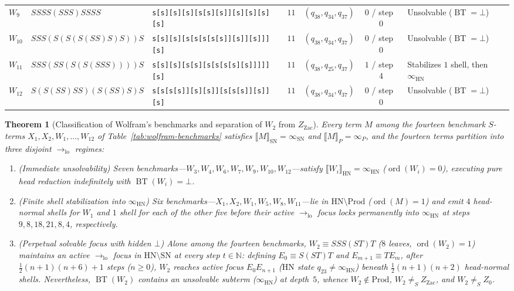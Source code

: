 \documentclass[11pt,reqno]{amsart}
\numberwithin{equation}{section}
\theoremstyle{plain}
\newtheorem{theorem}{Theorem}[section]
\theoremstyle{definition}
\theoremstyle{remark}
\DeclareMathOperator{\BT}{BT}
\DeclareMathOperator{\ord}{ord}
\newcommand{\SN}{\mathrm{SN}}
\newcommand{\HN}{\mathrm{HN}}
\newcommand{\Prod}{\mathrm{Prod}}
\newcommand{\sem}[1]{\llbracket #1 \rrbracket}
\begin{document}
\begin{table}[htbp]
\begin{tabular}{@{}lllcccl@{}}
$W_9$ & $S S S S (S S S) S S S S$ & \texttt{s[s][s][s][s[s][s]][s][s][s][s]} & $11$ & $(q_{38}, q_{34}, q_{37})$ & $0$ / step~$0$ & Unsolvable ($\BT = \bot$) \\
$W_{10}$ & $S S S (S(S(S(S S)S)S))S$ & \texttt{s[s][s][s[s[s[s[s]][s]][s]]][s]} & $11$ & $(q_{38}, q_{34}, q_{37})$ & $0$ / step~$0$ & Unsolvable ($\BT = \bot$) \\
$W_{11}$ & $S S S (S S (S(S(S S S))))S$ & \texttt{s[s][s][s[s][s[s[s[s][s]]]]][s]} & $11$ & $(q_{38}, q_{25}, q_{37})$ & $1$ / step~$4$ & Stabilizes $1$ shell, then $\infty_{\HN}$ \\
$W_{12}$ & $S(S(S S)S S)(S(S S)S)S$ & \texttt{s[s[s[s]][s][s]][s[s[s]][s]][s]} & $11$ & $(q_{38}, q_{34}, q_{37})$ & $0$ / step~$0$ & Unsolvable ($\BT = \bot$) \\
\bottomrule
\end{tabular}
\end{table}

\begin{theorem}[Classification of Wolfram's benchmarks and separation of $W_2$ from $Z_{\mathrm{Zac}}$]
\label{thm:wolfram-14-dichotomy}
Every term $M$ among the fourteen benchmark $S$-terms $X_1, X_2, W_1, \dots, W_{12}$ of Table~\ref{tab:wolfram-benchmarks} satisfies $\sem{M}_{\SN} = \infty_{\SN}$ and $\sem{M}_P = \infty_P$, and the fourteen terms partition into three disjoint $\to_{\mathrm{lo}}$ regimes:
\begin{enumerate}[label=(\roman*),leftmargin=2.2em]
\item \emph{(Immediate unsolvability)} Seven benchmarks---$W_3, W_4, W_6, W_7, W_9, W_{10}, W_{12}$---satisfy $\sem{W_i}_{\HN} = \infty_{\HN}$ ($\ord(W_i) = 0$), executing pure head reduction indefinitely with $\BT(W_i) = \bot$.
\item \emph{(Finite shell stabilization into $\infty_{\HN}$)} Six benchmarks---$X_1, X_2, W_1, W_5, W_8, W_{11}$---lie in $\HN \setminus \Prod$ ($\ord(M) = 1$) and emit $4$ head-normal shells for $W_1$ and $1$ shell for each of the other five before their active $\to_{\mathrm{lo}}$ focus locks permanently into $\infty_{\HN}$ at steps $9, 8, 18, 21, 8, 4$, respectively.
\item \emph{(Perpetual solvable focus with hidden $\bot$)} Alone among the fourteen benchmarks, $W_2 \equiv S S S (S T) T$ ($8$ leaves, $\ord(W_2) = 1$) maintains an active $\to_{\mathrm{lo}}$ focus in $\HN \setminus \SN$ at every step $t \in \mathbb{N}$: defining $E_0 \equiv S(S T)T$ and $E_{m+1} \equiv T E_m$, after $\frac{1}{2}(n+1)(n+6) + 1$ steps ($n \ge 0$), $W_2$ reaches active focus $E_0 E_{n+1}$ ($\HN$ state $q_{23} \neq \infty_{\HN}$) beneath $\frac{1}{2}(n+1)(n+2)$ head-normal shells. Nevertheless, $\BT(W_2)$ contains an unsolvable subterm ($\infty_{\HN}$) at depth~$5$, whence $W_2 \notin \Prod$, $W_2 \neq_S Z_{\mathrm{Zac}}$, and $W_2 \neq_S Z_0$.
\end{enumerate}
\end{theorem}
\end{document}
